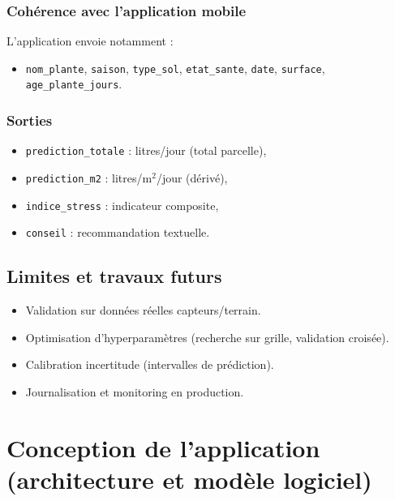 \documentclass[12pt,a4paper,twoside,openright]{report}
\begin{document}
\subsection{Cohérence avec l'application mobile}
L'application envoie notamment :
\begin{itemize}
  \item \texttt{nom\_plante}, \texttt{saison}, \texttt{type\_sol}, \texttt{etat\_sante}, \texttt{date}, \texttt{surface}, \texttt{age\_plante\_jours}.
\end{itemize}

\subsection{Sorties}
\begin{itemize}
  \item \texttt{prediction\_totale} : litres/jour (total parcelle),
  \item \texttt{prediction\_m2} : litres/m$^2$/jour (dérivé),
  \item \texttt{indice\_stress} : indicateur composite,
  \item \texttt{conseil} : recommandation textuelle.
\end{itemize}

\section{Limites et travaux futurs}

\begin{itemize}
  \item Validation sur données réelles capteurs/terrain.
  \item Optimisation d'hyperparamètres (recherche sur grille, validation croisée).
  \item Calibration incertitude (intervalles de prédiction).
  \item Journalisation et monitoring en production.
\end{itemize}

\cleardoublepage

\chapter{Conception de l'application (architecture et modèle logiciel)}
\end{document}
